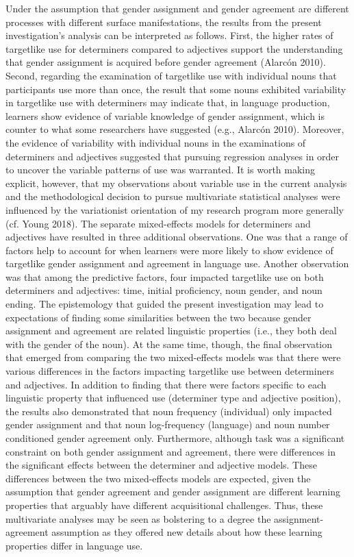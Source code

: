 \documentclass[12pt]{article}
\newenvironment{styleNoSpacing}{\setlength\leftskip{0cm}\setlength\rightskip{0cm plus 1fil}\setlength\parindent{0cm}\setlength\parfillskip{0pt plus 1fil}\setlength\parskip{0cm plus 1pt}\writerlistparindent\writerlistleftskip\leavevmode\normalfont\normalsize\fontsize{11pt}{13.2pt}\selectfont\writerlistlabel\ignorespaces}{\unskip\vspace{0cm plus 1pt}\par}
\newcommand\writerlistleftskip{}
\newcommand\writerlistparindent{}
\newcommand\writerlistlabel{}
\begin{document}
\begin{styleNoSpacing}
Under the assumption that gender assignment and gender agreement are different processes with different surface manifestations, the results from the present investigation’s analysis can be interpreted as follows. First, the higher rates of targetlike use for determiners compared to adjectives support the understanding that gender assignment is acquired before gender agreement (Alarcón 2010). Second, regarding the examination of targetlike use with individual nouns that participants use more than once, the result that some nouns exhibited variability in targetlike use with determiners may indicate that, in language production, learners show evidence of variable knowledge of gender assignment, which is counter to what some researchers have suggested (e.g., Alarcón 2010). Moreover, the evidence of variability with individual nouns in the examinations of determiners and adjectives suggested that pursuing regression analyses in order to uncover the variable patterns of use was warranted. It is worth making explicit, however, that my observations about variable use in the current analysis and the methodological decision to pursue multivariate statistical analyses were influenced by the variationist orientation of my research program more generally (cf. Young 2018). The separate mixed-effects models for determiners and adjectives have resulted in three additional observations. One was that a range of factors help to account for when learners were more likely to show evidence of targetlike gender assignment and agreement in language use. Another observation was that among the predictive factors, four impacted targetlike use on both determiners and adjectives: time, initial proficiency, noun gender, and noun ending. The epistemology that guided the present investigation may lead to expectations of finding some similarities between the two because gender assignment and agreement are related linguistic properties (i.e., they both deal with the gender of the noun). At the same time, though, the final observation that emerged from comparing the two mixed-effects models was that there were various differences in the factors impacting targetlike use between determiners and adjectives. In addition to finding that there were factors specific to each linguistic property that influenced use (determiner type and adjective position), the results also demonstrated that noun frequency (individual) only impacted gender assignment and that noun log-frequency (language) and noun number conditioned gender agreement only. Furthermore, although task was a significant constraint on both gender assignment and agreement, there were differences in the significant effects between the determiner and adjective models. These differences between the two mixed-effects models are expected, given the assumption that gender agreement and gender assignment are different learning properties that arguably have different acquisitional challenges. Thus, these multivariate analyses may be seen as bolstering to a degree the assignment-agreement assumption as they offered new details about how these learning properties differ in language use.
\end{styleNoSpacing}
\end{document}
